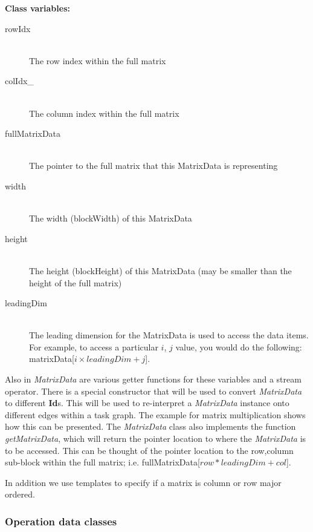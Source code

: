 \documentclass[]{article}
\begin{document}
\begin{flushleft}
\textbf{Class variables:}
\end{flushleft}

\begin{description}
	\item[rowIdx] \hfill \\
	The row index within the full matrix
	\item[colIdx_] \hfill \\
	The column index within the full matrix
	\item[fullMatrixData] \hfill \\
	The pointer to the full matrix that this MatrixData is representing
	\item[width] \hfill \\
	The width (blockWidth) of this MatrixData
	\item[height] \hfill \\
	The height (blockHeight) of this MatrixData (may be smaller than the height of the full matrix)
	\item[leadingDim] \hfill \\
	The leading dimension for the MatrixData is used to access the data items. For example, to access a particular $i$, $j$ value, you would do the following: \\matrixData[$i \times leadingDim + j$].
\end{description}

Also in \emph{MatrixData} are various getter functions for these variables and a stream operator. There is a special constructor that will be used to convert \emph{MatrixData} to different \textbf{Id}s. This will be used to re-interpret a \emph{MatrixData} instance onto different edges within a task graph. The example for matrix multiplication shows how this can be presented. The \emph{MatrixData} class also implements the function \emph{getMatrixData}, which will return the pointer location to where the \emph{MatrixData} is to be accessed. This can be thought of the pointer location to the row,column sub-block within the full matrix; i.e. fullMatrixData[$row * leadingDim + col$].

In addition we use templates to specify if a matrix is column or row major ordered.


\subsubsection{Operation data classes}
\end{document}
